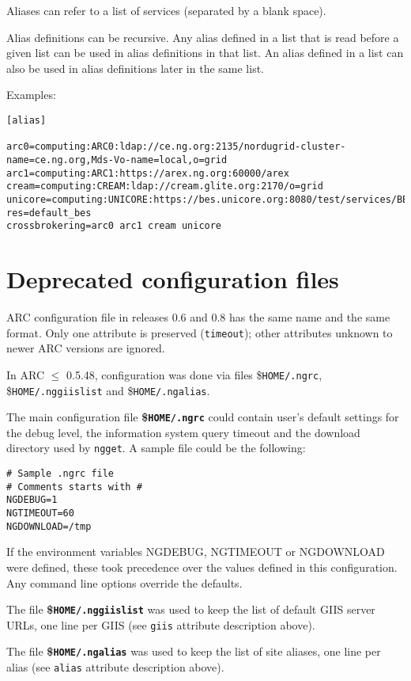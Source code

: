  Aliases can refer to a list of services (separated by a blank space).

 Alias definitions can be recursive. Any alias
 defined in a list that is read before a given list can be used in
 alias definitions in that list. An alias defined in a list can also
 be used in alias definitions later in the same list.
 
 Examples:
\begin{verbatim}
[alias]

arc0=computing:ARC0:ldap://ce.ng.org:2135/nordugrid-cluster-name=ce.ng.org,Mds-Vo-name=local,o=grid
arc1=computing:ARC1:https://arex.ng.org:60000/arex
cream=computing:CREAM:ldap://cream.glite.org:2170/o=grid
unicore=computing:UNICORE:https://bes.unicore.org:8080/test/services/BESFactory?res=default_bes
crossbrokering=arc0 arc1 cream unicore
\end{verbatim}

\section{Deprecated configuration files}

ARC configuration file in releases 0.6 and 0.8 has the same name and the same
format. Only one attribute is preserved (\texttt{timeout}); other attributes
unknown to newer ARC versions are ignored.

In ARC $\leq$ 0.5.48, configuration was done via files {\$}\texttt{HOME/.ngrc},
{\$}\texttt{HOME/.nggiislist} and {\$}\texttt{HOME/.ngalias}.

The main configuration file \textbf{{\$}\texttt{HOME/.ngrc}} could contain
user's default settings for the debug level, the information system
query timeout and the download directory used by \texttt{ngget}. A
sample file could be the following:
\begin{verbatim}
# Sample .ngrc file
# Comments starts with #
NGDEBUG=1
NGTIMEOUT=60
NGDOWNLOAD=/tmp
\end{verbatim}

If the environment variables NGDEBUG, NGTIMEOUT or NGDOWNLOAD were
defined, these took precedence over the values defined in this
configuration. Any command line options override the defaults.

The file \textbf{{\$}\texttt{HOME/.nggiislist}} was used to keep the
list of default GIIS server URLs, one line per GIIS (see \texttt{giis}
attribute description above). 

The file \textbf{{\$}\texttt{HOME/.ngalias}} was used to keep the
list of site aliases, one line per alias (see \texttt{alias}
attribute description above). 
